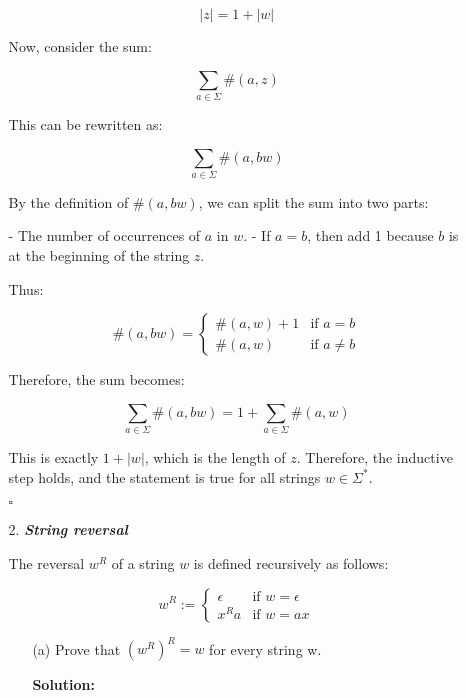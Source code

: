\documentclass[9pt,tikz,border=2mm]{article}
\begin{document}
\begin{enumerate}
\begin{enumerate}
            \[
                |z| = 1 + |w|
            \]

            Now, consider the sum:

            \[
                \sum_{a \in \Sigma} \#(a, z)
            \]

            This can be rewritten as:

            \[
                \sum_{a \in \Sigma} \#(a, bw)
            \]

            By the definition of \( \#(a, bw) \), we can split the sum into two parts:

            - The number of occurrences of \( a \) in \( w \).
            - If \( a = b \), then add 1 because \( b \) is at the beginning of the string \( z \).

            Thus:

            \[
                \#(a, bw) = \begin{cases} 
                \#(a, w) + 1 & \text{if } a = b \\
                \#(a, w) & \text{if } a \neq b 
                \end{cases}
                \]

            Therefore, the sum becomes:

            \[
                \sum_{a \in \Sigma} \#(a, bw) = 1 + \sum_{a \in \Sigma} \#(a, w)
            \]

            This is exactly \( 1 + |w| \), which is the length of \( z \). Therefore, the inductive step holds, and the             statement is true for all strings \( w \in \Sigma^* \).

            $\square$

        \item[2.]\textbf{\textit{String reversal}}

        The reversal $w^R$ of a string $w$ is defined recursively as follows:

        \[w^R :=
            \begin{cases}
                \epsilon & \text{if } w=\epsilon\\
                x^Ra & \text{if } w=ax
            \end{cases}
        \]
            \begin{enumerate}
                \item[(a)]Prove that $(w^R)^R = w$ for every string w.

                \textbf{Solution:}


\end{enumerate}
\end{enumerate}
\end{enumerate}
\end{document}
